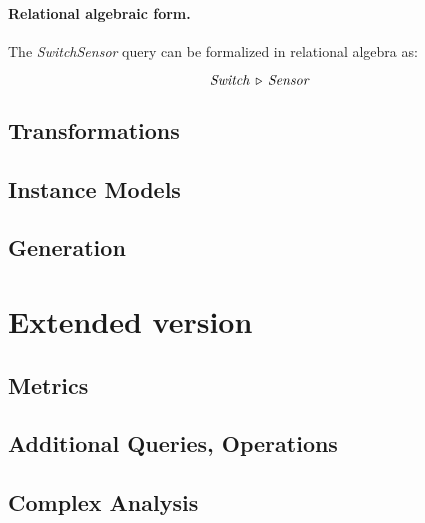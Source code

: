
\paragraph{Relational algebraic form.} The \textit{SwitchSensor} query can be formalized in relational algebra as:

$$ \mathit{Switch} \, \triangleright \, \mathit{Sensor} $$



\subsection{Transformations}
\subsection{Instance Models}
\subsection{Generation}

\section{Extended version}
\subsection{Metrics}
\subsection{Additional Queries, Operations}
\subsection{Complex Analysis}






